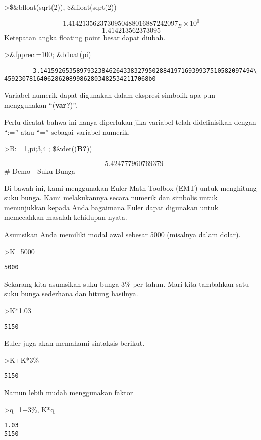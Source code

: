 \documentclass[
]{book}
\begin{document}
\textgreater\$\&bfloat(sqrt(2)), \$\&float(sqrt(2))

\[1.4142135623730950488016887242097_B \times 10^{0}\] \[1.414213562373095\]Ketepatan angka floating point besar dapat diubah.

\textgreater\&fpprec:=100; \&bfloat(pi)

\begin{verbatim}
        3.14159265358979323846264338327950288419716939937510582097494\
4592307816406286208998628034825342117068b0
\end{verbatim}

Variabel numerik dapat digunakan dalam ekspresi simbolik apa pun menggunakan ``(\textbf{var?})''.

Perlu dicatat bahwa ini hanya diperlukan jika variabel telah didefinisikan dengan ``:='' atau ``='' sebagai variabel numerik.

\textgreater B:={[}1,pi;3,4{]}; \$\&det((\textbf{B?}))

\[-5.424777960769379\]\# Demo - Suku Bunga

Di bawah ini, kami menggunakan Euler Math Toolbox (EMT) untuk menghitung suku bunga. Kami melakukannya secara numerik dan simbolis untuk menunjukkan kepada Anda bagaimana Euler dapat digunakan untuk memecahkan masalah kehidupan nyata.

Asumsikan Anda memiliki modal awal sebesar 5000 (misalnya dalam dolar).

\textgreater K=5000

\begin{verbatim}
5000
\end{verbatim}

Sekarang kita asumsikan suku bunga 3\% per tahun. Mari kita tambahkan satu suku bunga sederhana dan hitung hasilnya.

\textgreater K*1.03

\begin{verbatim}
5150
\end{verbatim}

Euler juga akan memahami sintaksis berikut.

\textgreater K+K*3\%

\begin{verbatim}
5150
\end{verbatim}

Namun lebih mudah menggunakan faktor

\textgreater q=1+3\%, K*q

\begin{verbatim}
1.03
5150
\end{verbatim}
\end{document}
